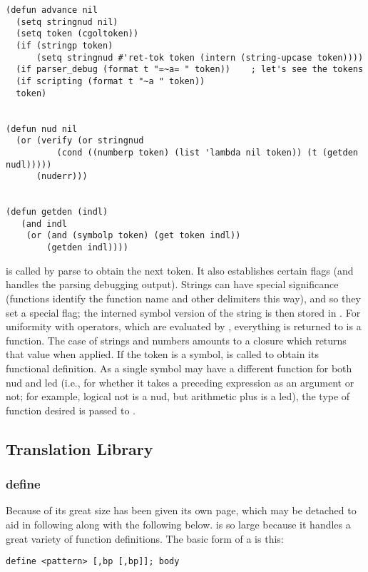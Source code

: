 {\footnotesize\begin{verbatim}
(defun advance nil
  (setq stringnud nil)
  (setq token (cgoltoken))
  (if (stringp token)
      (setq stringnud #'ret-tok token (intern (string-upcase token))))
  (if parser_debug (format t "=~a= " token))	; let's see the tokens
  (if scripting (format t "~a " token))
  token)


(defun nud nil 
  (or (verify (or stringnud
		  (cond ((numberp token) (list 'lambda nil token)) (t (getden nudl)))))
      (nuderr)))


(defun getden (indl)
   (and indl
	(or (and (symbolp token) (get token indl))
	    (getden indl))))

\end{verbatim}}

 is called by parse to obtain the next token.  It also
establishes certain flags (and handles the parsing debugging output).
Strings can have special significance (functions identify the function name
and other delimiters this way), and so they set a special flag; the
interned symbol version of the string is then stored in .
For uniformity with operators, which are evaluated 
by , everything
is returned to  is a function. The case of strings and
numbers amounts to a closure which returns that value when applied.  If the
token is a symbol,  is called to obtain its functional
definition.  As a single symbol may have a different function for both nud
and led (i.e., for whether it takes a preceding expression as an argument
or not; for example, logical not is a nud, but arithmetic plus is a led),
the type of function desired is passed to .


\subsection {Translation Library}

\subsubsection{define}

Because of its great size  has been given its
own page, which may be detached to aid in following along with the
following below.
 is so large because it handles a great variety of function
definitions.  The basic form of a  is this:

{\footnotesize\begin{verbatim}
define <pattern> [,bp [,bp]]; body
\end{verbatim}}


